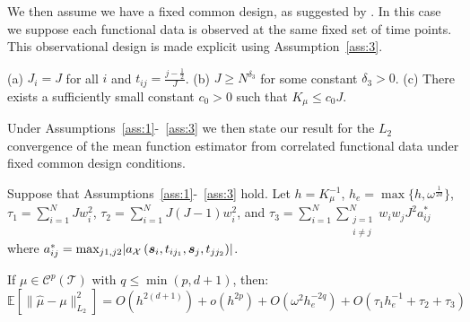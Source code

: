 We then assume we have a fixed common design, as suggested by \citep{xiao_asymptotic_2020}. In this case we suppose each functional data is observed at the same fixed set of time points. This observational design is made explicit using Assumption~\ref{ass:3}. 

\begin{assumption}
	(a) $J_i = J$ for all $i$ and $t_{ij} = \frac{j-\frac{1}{2}}{J}$. (b) $J \geq N^{\delta_3}$ for some constant $\delta_3 > 0$. (c) There exists a sufficiently small constant $c_0 > 0$ such that $K_\mu \leq c_0 J$.
	\label{ass:3}
\end{assumption}

Under Assumptions~\ref{ass:1}-~\ref{ass:3} we then state our result for the $L_2$ convergence of the mean function estimator from correlated functional data under fixed common design conditions. 

\begin{theorem}
	Suppose that Assumptions~\ref{ass:1}-~\ref{ass:3} hold. Let $h = K_\mu^{-1}$, $h_e = \max\{h, \omega^{\frac{1}{2d}}\}$, $\tau_1 = \sum_{i=1}^{N} J w_i^2$, $\tau_2 = \sum_{i=1}^{N}J(J -1) w_i^2$, and $\tau_3 = \sum_{i=1}^N \sum_{\substack{j=1 \\ i \ne j}}^N w_i w_j J^2 a_{ij}^*$ where $a_{ij}^* = \max_{j1, j2} \lvert a_\mathcal{X}\left(\bm{{s}}_{i}, t_{ij_1}, \bm{{s}}_{j}, t_{jj_2}\right) \rvert$. 
	
	If $\mu \in \mathcal{C}^p\left( \mathcal{T} \right)$ with $q \leq \min(p, d+1)$, then:
	\begin{equation*}
		\mathbb{E}\left[ \lVert \hat{\mu} - \mu \rVert_{L_2}^2 \right] = O\left( h^{2(d+1)} \right) + o(h^{2p}) + O\left( \omega^2 h_e^{-2q} \right) + O\left( \tau_1 h_e^{-1}+ \tau_2 + \tau_3\right)
	\end{equation*}
	\label{thm:cpace_mean}
\end{theorem}

